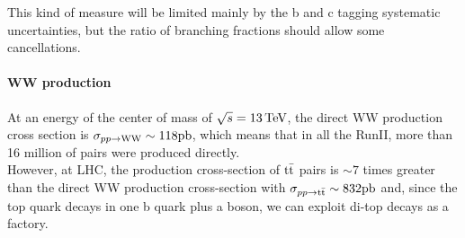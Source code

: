 This kind of measure will be limited mainly by the b and c tagging systematic uncertainties, but the ratio of branching fractions should allow some cancellations.
\paragraph*{WW production}
At an energy of the center of mass of $\sqrt{s}=13 {\,\text{Te\hspace{-.08em}V}}$, the direct WW production cross section is $\sigma_{pp\to{\ensuremath{\text{W}}}{\ensuremath{\text{W}}}}\sim118 \text{pb}$, which means that in all the RunII, more than 16 million of \PW pairs were produced directly.\\
However, at LHC, the production cross-section of ${{\text{t}}{\bar{\text{t}}}}$ pairs is $\sim 7$ times greater than the direct WW production cross-section with $\sigma_{pp\to {\ensuremath{{\text{t}}{\bar{\text{t}}}}}}\sim832\text{pb}$ and, since the top quark decays in one b quark plus a \PW boson, we can exploit di-top decays as a \PW\PW factory.
